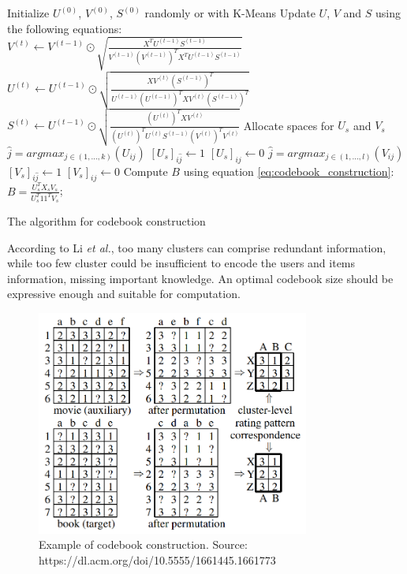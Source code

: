 \begin{algorithm}[H]
Initialize $U^{(0)}$, $V^{(0)}$, $S^{(0)}$ randomly or with K-Means\;
{
  Update $U$, $V$ and $S$ using the following equations:\\
  $V^{(t)} \gets V^{(t - 1)} \odot \sqrt{\frac{X^T U^{(t - 1)} S^{(t - 1)}}{V^{(t - 1)} (V^{(t - 1)})^T X^T U^{(t - 1)} S^{(t - 1)}}}$\;
  $U^{(t)} \gets U^{(t - 1)} \odot \sqrt{\frac{X V^{(t)} (S^{(t - 1)})^T}{U^{(t - 1)} (U^{(t - 1)})^T X V^{(t)} (S^{(t - 1)})^T}}$\;
  $S^{(t)} \gets U^{(t - 1)} \odot \sqrt{\frac{(U^{(t)})^T X V^{(t)}}{(U^{(t)})^T U^{(t)} S^{(t - 1)} (V^{(t)})^T V^{(t)}}}$\;
}
Allocate spaces for $U_s$ and $V_s$\;
{
  $\hat{j} = argmax_{j \in (1,...,k)}(U_{ij})$\;
  $[U_s]_{i\hat{j}} \gets 1$\;
  {
    $[U_s]_{ij} \gets 0$\;
  }
}
{
  $\hat{j} = argmax_{j \in (1,...,l)}(V_{ij})$\;
  $[V_s]_{i\hat{j}} \gets 1$\;
  {
    $[V_s]_{ij} \gets 0$\;
  }
}
Compute $B$ using equation \ref{eq:codebook_construction}:\\
$B = \frac{U_s^T X_s V_s}{U_s^T 11^T V_s}$;
\caption{The algorithm for codebook construction}
\end{algorithm}
\vskip 0.7cm
According to Li \textit{et al.}, too many clusters can comprise redundant information, while too few cluster could be insufficient to encode the users and items information, missing important knowledge. An optimal codebook size should be expressive enough and suitable for computation.
\begin{figure}[hbt!]
  \centering
  \includegraphics[width=0.8\textwidth]{pictures/codebook-construction}
  \caption{Example of codebook construction. Source: https://dl.acm.org/doi/10.5555/1661445.1661773}
\end{figure}


